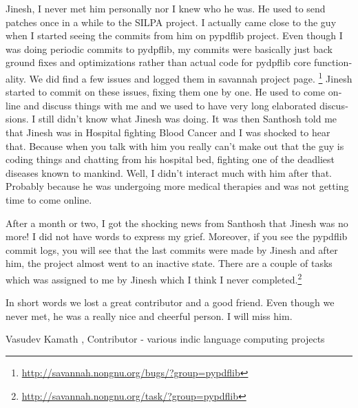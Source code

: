 \begin{english}

Jinesh, I never met him personally nor I knew who he was. He used to
send patches once in a while to the SILPA project. I actually came close
to the guy when I started seeing the commits from him on pypdflib
project. Even though I was doing periodic commits to pydpflib, my
commits were basically just back ground fixes and optimizations rather than
actual code for pydpflib core functionality. We did find a few issues
and logged them in savannah project page. \footnote{\url{http://savannah.nongnu.org/bugs/?group=pypdflib}} Jinesh started to
commit on these issues, fixing them one by one. He used to come online
and discuss things with me and we used to have very long elaborated
discussions. I still didn't know what Jinesh was doing. It was then
Santhosh told me that Jinesh was in Hospital fighting Blood Cancer and
I was shocked to hear that. Because when you talk with him you really
can't make out that the guy is coding things and chatting from his hospital bed,
fighting one of the deadliest diseases known to mankind. Well, I didn't
interact much with him after that. Probably because he was undergoing
more medical therapies and was not getting time to come online.

After a month or two, I got the shocking news from Santhosh that Jinesh
was no more! I did not have words to express my grief. Moreover, if you see the pypdflib
commit logs, you will see that the last commits were made by Jinesh and after
him, the project almost went to an inactive state. There are a couple of
tasks which was assigned to me by Jinesh which I think I never
completed.\footnote{\url{http://savannah.nongnu.org/task/?group=pypdflib}}

In short words we lost a great contributor and a good friend. Even
though we never met, he was a really nice and cheerful person. I will
miss him.

Vasudev Kamath , Contributor - various indic language computing projects
 \end{english}
 \newpage
